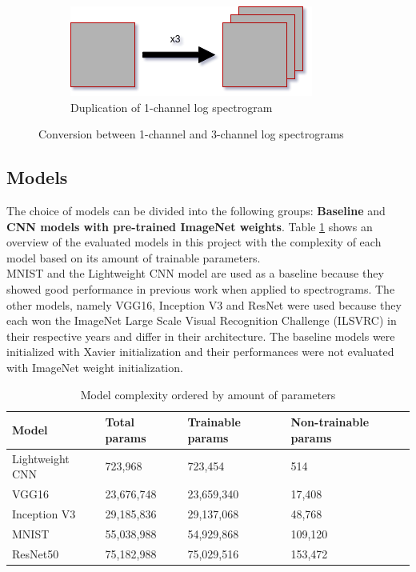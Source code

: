 \documentclass{article}
\theoremstyle{definition}
\theoremstyle{remark}
\begin{document}
\begin{figure}[h!]
\par\bigskip
\begin{subfigure}{.5\textwidth}
  \centering
  \includegraphics[width=1\linewidth]{img/grayscale_multiply.png}
  \caption{Duplication of 1-channel log spectrogram}
  \label{fig:sub2}
\end{subfigure}
\caption{Conversion between 1-channel and 3-channel log spectrograms}
\label{fig:channel_conversion}
\end{figure}



\newpage

\subsection{Models}

The choice of models can be divided into the following groups: \textbf{Baseline} and \textbf{CNN models with pre-trained ImageNet weights}. Table \ref{tab:model_complexity} shows an overview of the evaluated models in this project with the complexity of each model based on its amount of trainable parameters.\\
MNIST and the Lightweight CNN model are used as a baseline because they showed good performance in previous work when applied to spectrograms. The other models, namely VGG16, Inception V3 and ResNet were used because they each won the ImageNet Large Scale Visual Recognition Challenge (ILSVRC) in their respective years and differ in their architecture. The baseline models were initialized with Xavier initialization and their performances were not evaluated with ImageNet weight initialization.\\


\begin{table}[h!]
\center
\begin{tabular}{|l|l|l|l|}
\hline
\textbf{Model} & \textbf{Total params} & \textbf{Trainable params} & \textbf{Non-trainable params} \\ \hline
Lightweight CNN & 723,968 & 723,454 & 514 \\ \hline
VGG16  		& 23,676,748   & 23,659,340        & 17,408 \\ \hline	
Inception V3	& 29,185,836   & 29,137,068  	   & 48,768	 \\ \hline
MNIST			& 55,038,988   & 54,929,868   	   & 109,120  \\ \hline
ResNet50  	& 75,182,988   & 75,029,516 	   & 153,472 \\ \hline	
\end{tabular}
\caption{Model complexity ordered by amount of parameters}
\label{tab:model_complexity}
\end{table}
\end{document}
